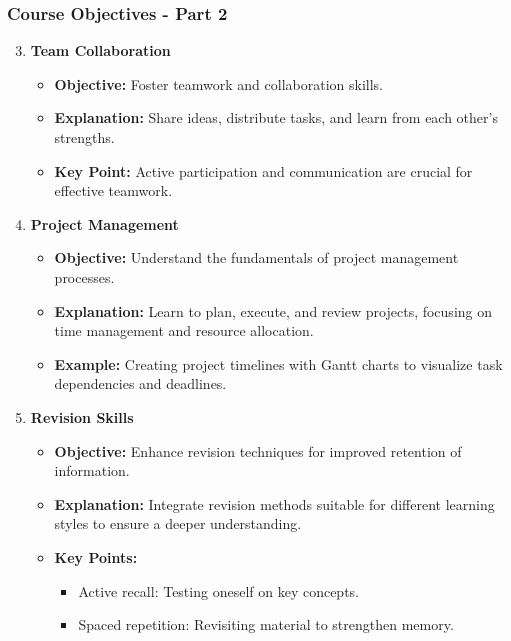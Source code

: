 \documentclass[aspectratio=169]{beamer}
\begin{document}
\begin{frame}[fragile]
    \frametitle{Course Objectives - Part 2}
    \begin{enumerate}
        \setcounter{enumi}{2} %
        \item \textbf{Team Collaboration}
        \begin{itemize}
            \item \textbf{Objective:} Foster teamwork and collaboration skills.
            \item \textbf{Explanation:} Share ideas, distribute tasks, and learn from each other’s strengths.
            \item \textbf{Key Point:} Active participation and communication are crucial for effective teamwork.
        \end{itemize}

        \item \textbf{Project Management}
        \begin{itemize}
            \item \textbf{Objective:} Understand the fundamentals of project management processes.
            \item \textbf{Explanation:} Learn to plan, execute, and review projects, focusing on time management and resource allocation.
            \item \textbf{Example:} Creating project timelines with Gantt charts to visualize task dependencies and deadlines.
        \end{itemize}

        \item \textbf{Revision Skills}
        \begin{itemize}
            \item \textbf{Objective:} Enhance revision techniques for improved retention of information.
            \item \textbf{Explanation:} Integrate revision methods suitable for different learning styles to ensure a deeper understanding.
            \item \textbf{Key Points:}
            \begin{itemize}
                \item Active recall: Testing oneself on key concepts.
                \item Spaced repetition: Revisiting material to strengthen memory.
            \end{itemize}
        \end{itemize}
    \end{enumerate}
\end{frame}
\end{document}
